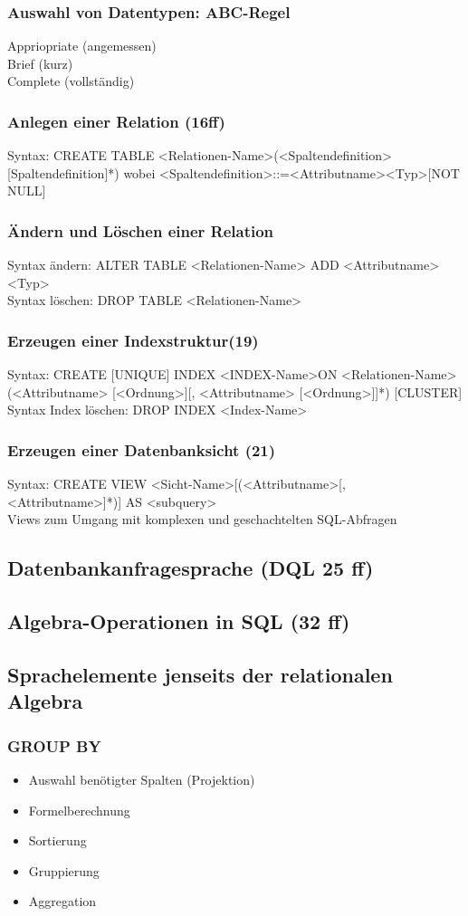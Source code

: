\subsubsection{Auswahl von Datentypen: ABC-Regel}
Appriopriate (angemessen)\\
Brief (kurz)\\
Complete (vollständig)
\subsubsection{Anlegen einer Relation (16ff)}
Syntax: CREATE TABLE <Relationen-Name>(<Spaltendefinition>[Spaltendefinition]*) wobei <Spaltendefinition>::=<Attributname><Typ>[NOT NULL]
\subsubsection{Ändern und Löschen einer Relation}
Syntax ändern: ALTER TABLE <Relationen-Name> ADD <Attributname> <Typ> \\
Syntax löschen: DROP TABLE <Relationen-Name>
\subsubsection{Erzeugen einer Indexstruktur(19)}
Syntax: CREATE [UNIQUE] INDEX 
<INDEX-Name>ON <Relationen-Name>\\(<Attributname> [<Ordnung>][, <Attributname> [<Ordnung>]]*) [CLUSTER] \\
Syntax Index löschen: DROP INDEX <Index-Name>
\subsubsection{Erzeugen einer Datenbanksicht (21)}
Syntax: CREATE VIEW <Sicht-Name>[(<Attributname>[, <Attributname>]*)] AS <subquery> \\
Views zum Umgang mit komplexen und geschachtelten SQL-Abfragen
\subsection{Datenbankanfragesprache (DQL 25 ff)}
\subsection{Algebra-Operationen in SQL (32 ff)}
\subsection{Sprachelemente jenseits der relationalen Algebra}
\subsubsection{GROUP BY}
\begin{itemize}
	\item Auswahl benötigter Spalten (Projektion)
	\item Formelberechnung
	\item Sortierung
	\item Gruppierung
	\item Aggregation
\end{itemize}
